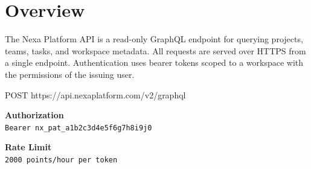 \section*{Overview}

The Nexa Platform API is a read-only GraphQL endpoint for querying projects, teams, tasks, and workspace metadata. All requests are served over HTTPS from a single endpoint. Authentication uses bearer tokens scoped to a workspace with the permissions of the issuing user.

\vspace{4pt}
\begin{schemabox}[title=Endpoint]
POST  https://api.nexaplatform.com/v2/graphql
\end{schemabox}

\vspace{6pt}

\begin{minipage}{0.48\textwidth}
  \begin{notebox}
  {\faLock\;\small\textbf{Authorization}}\\
  \texttt{\footnotesize Bearer nx\_pat\_a1b2c3d4e5f6g7h8i9j0}
  \end{notebox}
\end{minipage}%
\hfill%
\begin{minipage}{0.48\textwidth}
  \begin{notebox}
  {\faExclamationTriangle\;\small\textbf{Rate Limit}}\\
  \texttt{\footnotesize 2000\ points/hour per token}
  \end{notebox}
\end{minipage}
\par
